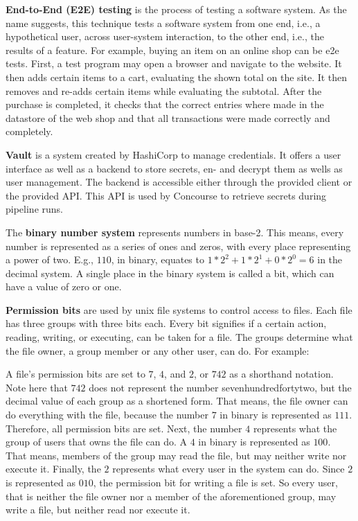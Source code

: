 \textbf{End-to-End (E2E) testing}\cite{end-to-end-integration-testing-design} is the process of testing a software system.
As the name suggests, this technique tests a software system from one end, i.e., a hypothetical user, across user-system interaction, to the other end, i.e., the results of a feature.
For example, buying an item on an online shop can be e2e tests.
First, a test program may open a browser and navigate to the website.
It then adds certain items to a cart, evaluating the shown total on the site.
It then removes and re-adds certain items while evaluating the subtotal.
After the purchase is completed, it checks that the correct entries where made in the datastore of the web shop and that all transactions were made correctly and completely.

\textbf{Vault}\cite{vault} is a system created by HashiCorp to manage credentials.
It offers a user interface as well as a backend to store secrets, en- and decrypt them as wells as user management.
The backend is accessible either through the provided client or the provided API.
This API is used by Concourse to retrieve secrets during pipeline runs.

The \textbf{binary number system} represents numbers in base-2.
This means, every number is represented as a series of ones and zeros, with every place representing a power of two.
E.g., $110$, in binary, equates to $1 * 2^2 + 1 * 2^1 + 0 * 2^0 = 6$ in the decimal system.
A single place in the binary system is called a bit, which can have a value of zero or one.

\textbf{Permission bits}\cite{unix-file-permissions} are used by unix file systems to control access to files.
Each file has three groups with three bits each.
Every bit signifies if a certain action, reading, writing, or executing, can be taken for a file.
The groups determine what the file owner, a group member or any other user, can do.
For example:

A file's permission bits are set to $7$, $4$, and $2$, or $742$ as a shorthand notation.
Note here that $742$ does not represent the number sevenhundredfortytwo, but the decimal value of each group as a shortened form.
That means, the file owner can do everything with the file, because the number $7$ in binary is represented as $111$.
Therefore, all permission bits are set.
Next, the number $4$ represents what the group of users that owns the file can do.
A $4$ in binary is represented as $100$.
That means, members of the group may read the file, but may neither write nor execute it.
Finally, the $2$ represents what every user in the system can do.
Since $2$ is represented as $010$, the permission bit for writing a file is set.
So every user, that is neither the file owner nor a member of the aforementioned group, may write a file, but neither read nor execute it.

